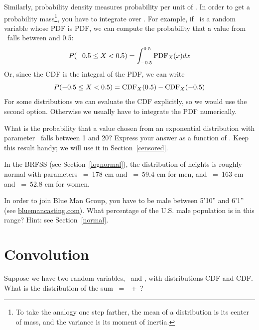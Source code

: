 \documentclass[12pt]{book}
\newif\ifplastex
\begin{document}
Similarly, probability density measures probability per unit of \x.
In order to get a probability mass\footnote{To take the analogy one
step farther, the mean of a distribution is its center of mass, and
the variance is its moment of inertia.}, you have to integrate over \x.
For example, if \x~is a random variable whose PDF is PDF, we
can compute the probability that a value from \X~falls between 
 and 0.5:
%
\[ P(-0.5 \le X < 0.5) = \int_{-0.5}^{0.5} \mathrm{PDF}_{X}(x) dx \]
%
Or, since the CDF is the integral of the PDF, we can write
%
\[ P(-0.5 \le X < 0.5) = \mathrm{CDF}_{X}(0.5) - \mathrm{CDF}_{X}(-0.5) \]
%
For some distributions we can evaluate the CDF explicitly, so we would
use the second option.  Otherwise we usually have to integrate the
PDF numerically.

\begin{exercise}
\ifplastex
    \Anchor{expo_pdf}
\else
    \label{expo_pdf}
\fi
What is the probability that a value chosen from an exponential
distribution with parameter \mylambda~falls between 1 and 20?  Express
your answer as a function of \mylambda.  Keep this result handy;
we will use it in Section~\ref{censored}.

\end{exercise}


\begin{exercise}
In the BRFSS (see Section~\ref{lognormal}), the distribution of
heights is roughly normal with parameters \mymu~=~178 cm and
\sigmasq~=~59.4 cm for men, and \mymu~=~163 cm and \sigmasq~=~52.8 cm for
women.

In order to join Blue Man Group, you have to be male between 5'10''
and 6'1'' (see \url{bluemancasting.com}).  What percentage of the
U.S. male population is in this range?  Hint: see
Section~\ref{normal}.

\end{exercise}


\section{Convolution}

Suppose we have two random variables, \X~and \Y, 
with distributions CDF and CDF.  What is the
distribution of the sum \Z~=~\X~+~\Y?
\end{document}
